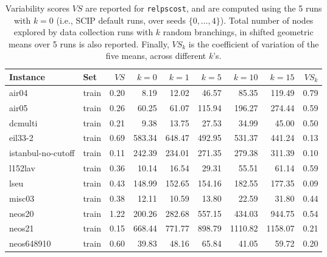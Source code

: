 \documentclass[letterpaper]{article} %
\begin{document}
\begin{table*}[t]
    \caption{Variability scores $\mathit{VS}$ are reported for \texttt{relpscost}, and are computed using the 5 runs with $k=0$ (i.e., SCIP default runs, over seeds $\{0, \dots, 4\}$). Total number of nodes explored by data collection runs with $k$ random branchings, in shifted geometric means over 5 runs is also reported. Finally, $\mathit{VS}_k$ is the coefficient of variation of the five means, across different $k$'s. }
    \label{tab:k_vs}
    \centering
    \begin{footnotesize}
\begin{tabular}{ll|r|rrrrr|r}
\toprule
           Instance &    Set &    $\mathit{VS}$ &    $k=0$ &    $k=1$ &    $k=5$ &   $k=10$ &   $k=15$ &  $\mathit{VS}_k$ \\
\midrule
              air04 &  train &             0.20 &     8.19 &    12.02 &    46.57 &    85.35 &   119.49 &             0.79 \\
              air05 &  train &             0.26 &    60.25 &    61.07 &   115.94 &   196.27 &   274.44 &             0.59 \\
            dcmulti &  train &             0.21 &     9.38 &    13.75 &    27.53 &    34.99 &    45.00 &             0.50 \\
            eil33-2 &  train &             0.69 &   583.34 &   648.47 &   492.95 &   531.37 &   441.24 &             0.13 \\
 istanbul-no-cutoff &  train &             0.11 &   242.39 &   234.01 &   271.35 &   279.38 &   311.39 &             0.10 \\
            l152lav &  train &             0.36 &    10.14 &    16.54 &    29.31 &    55.51 &    61.14 &             0.59 \\
               lseu &  train &             0.43 &   148.99 &   152.65 &   154.16 &   182.55 &   177.35 &             0.09 \\
             misc03 &  train &             0.38 &    12.11 &    10.59 &    13.80 &    22.59 &    31.80 &             0.44 \\
             neos20 &  train &             1.22 &   200.26 &   282.68 &   557.15 &   434.03 &   944.75 &             0.54 \\
             neos21 &  train &             0.15 &   668.44 &   771.77 &   898.79 &  1110.82 &  1158.07 &             0.21 \\
         neos648910 &  train &             0.60 &    39.83 &    48.16 &    65.84 &    41.05 &    59.72 &             0.20 \\

\end{tabular}
\end{footnotesize}
\end{table*}
\end{document}
